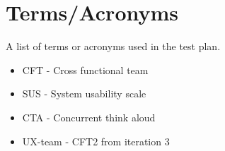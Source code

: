 \section{Terms/Acronyms}
\noindent A list of terms or acronyms used in the test plan.\newline %
\begin{itemize}
  \item CFT - Cross functional team
  \item SUS - System usability scale
  \item CTA - Concurrent think aloud
  \item UX-team - CFT2 from iteration 3
\end{itemize}
